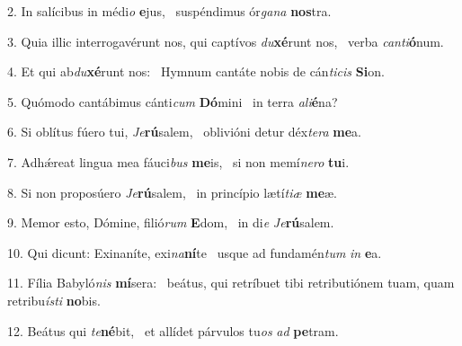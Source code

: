 2. In salícibus in médi\textit{o} \textbf{e}jus, \ast\  suspéndimus ór\textit{ga}\textit{na} \textbf{nos}tra.\

3. Quia illic interrogavérunt nos, qui captívos \textit{du}\textbf{xé}runt nos, \ast\  verba \textit{can}\textit{ti}\textbf{ó}num.\

4. Et qui ab\textit{du}\textbf{xé}runt nos: \ast\  Hymnum cantáte nobis de cán\textit{ti}\textit{cis} \textbf{Si}on.\

5. Quómodo cantábimus cánti\textit{cum} \textbf{Dó}mini \ast\  in terra \textit{a}\textit{li}\textbf{é}na?\

6. Si oblítus fúero tui, \textit{Je}\textbf{rú}salem, \ast\  oblivióni detur déx\textit{te}\textit{ra} \textbf{me}a.\

7. Adhǽreat lingua mea fáuci\textit{bus} \textbf{me}is, \ast\  si non memí\textit{ne}\textit{ro} \textbf{tu}i.\

8. Si non proposúero \textit{Je}\textbf{rú}salem, \ast\  in princípio lætí\textit{ti}\textit{æ} \textbf{me}æ.\

9. Memor esto, Dómine, filió\textit{rum} \textbf{E}dom, \ast\  in di\textit{e} \textit{Je}\textbf{rú}salem.\

10. Qui dicunt: Exinaníte, exi\textit{na}\textbf{ní}te \ast\  usque ad fundamén\textit{tum} \textit{in} \textbf{e}a.\

11. Fília Babyló\textit{nis} \textbf{mí}sera: \ast\  beátus, qui retríbuet tibi retributiónem tuam, quam retribu\textit{ís}\textit{ti} \textbf{no}bis.\

12. Beátus qui \textit{te}\textbf{né}bit, \ast\  et allídet párvulos tu\textit{os} \textit{ad} \textbf{pe}tram.\

